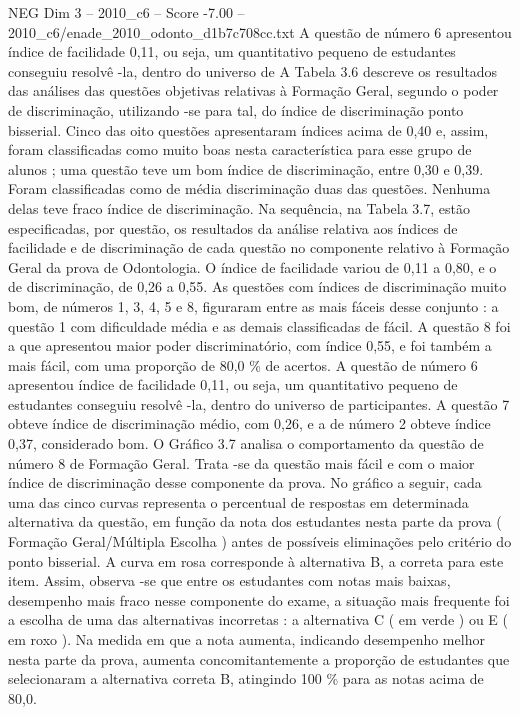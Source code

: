 \begin{textsample}{NEG Dim 3 – 2010\_c6 – Score -7.00 – 2010\_c6/enade\_2010\_odonto\_d1b7c708cc.txt}
A questão de número 6 apresentou índice de facilidade 0,11, ou seja, um quantitativo pequeno de estudantes conseguiu resolvê -la, dentro do universo de A Tabela 3.6 descreve os resultados das análises das questões objetivas relativas à Formação Geral, segundo o poder de discriminação, utilizando -se para tal, do índice de discriminação ponto bisserial.
Cinco das oito questões apresentaram índices acima de 0,40 e, assim, foram classificadas como muito boas nesta característica para esse grupo de alunos ; uma questão teve um bom índice de discriminação, entre 0,30 e 0,39.
Foram classificadas como de média discriminação duas das questões.
Nenhuma delas teve fraco índice de discriminação.
Na sequência, na Tabela 3.7, estão especificadas, por questão, os resultados da análise relativa aos índices de facilidade e de discriminação de cada questão no componente relativo à Formação Geral da prova de Odontologia.
O índice de facilidade variou de 0,11 a 0,80, e o de discriminação, de 0,26 a 0,55.
As questões com índices de discriminação muito bom, de números 1, 3, 4, 5 e 8, figuraram entre as mais fáceis desse conjunto : a questão 1 com dificuldade média e as demais classificadas de fácil.
A questão 8 foi a que apresentou maior poder discriminatório, com índice 0,55, e foi também a mais fácil, com uma proporção de 80,0 \% de acertos.
A questão de número 6 apresentou índice de facilidade 0,11, ou seja, um quantitativo pequeno de estudantes conseguiu resolvê -la, dentro do universo de participantes.
A questão 7 obteve índice de discriminação médio, com 0,26, e a de número 2 obteve índice 0,37, considerado bom.
O Gráfico 3.7 analisa o comportamento da questão de número 8 de Formação Geral.
Trata -se da questão mais fácil e com o maior índice de discriminação desse componente da prova.
No gráfico a seguir, cada uma das cinco curvas representa o percentual de respostas em determinada alternativa da questão, em função da nota dos estudantes nesta parte da prova ( Formação Geral/Múltipla Escolha ) antes de possíveis eliminações pelo critério do ponto bisserial.
A curva em rosa corresponde à alternativa B, a correta para este item.
Assim, observa -se que entre os estudantes com notas mais baixas, desempenho mais fraco nesse componente do exame, a situação mais frequente foi a escolha de uma das alternativas incorretas : a alternativa C ( em verde ) ou E ( em roxo ).
Na medida em que a nota aumenta, indicando desempenho melhor nesta parte da prova, aumenta concomitantemente a proporção de estudantes que selecionaram a alternativa correta B, atingindo 100 \% para as notas acima de 80,0.

\end{textsample}
